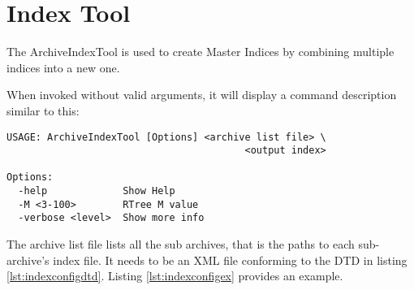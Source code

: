 \section{Index Tool}
The ArchiveIndexTool is used to create Master Indices by combining
multiple indices into a new one.

When invoked without valid arguments, it will display a command
description similar to this:

\begin{lstlisting}[frame=none,keywordstyle=\sffamily]
USAGE: ArchiveIndexTool [Options] <archive list file> \
                                         <output index>
 
Options:
  -help             Show Help
  -M <3-100>        RTree M value
  -verbose <level>  Show more info
\end{lstlisting}

\noindent The archive list file lists all the sub archives,
that is the paths to each sub-archive's index file. It needs to be an
XML file conforming to the DTD in listing \ref{lst:indexconfigdtd}.
Listing \ref{lst:indexconfigex} provides an example.



